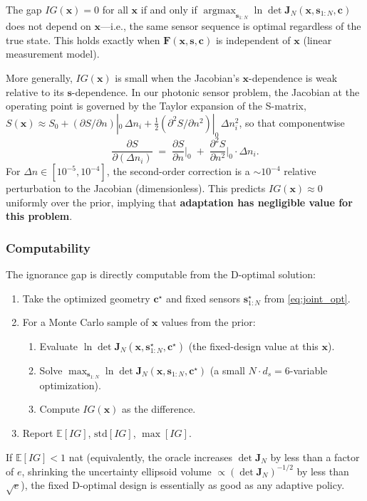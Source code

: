 \documentclass[11pt,a4paper]{article}
\newcommand{\E}{\mathbb{E}}
\newcommand{\argmax}{\operatorname{argmax}}
\begin{document}
The gap $IG(\bm{x}) = 0$ for all $\bm{x}$ if and only if $\argmax_{\bm{s}_{1:N}} \ln\det\bm{J}_N(\bm{x}, \bm{s}_{1:N}, \bm{c})$ does not depend on $\bm{x}$---i.e., the same sensor sequence is optimal regardless of the true state.  This holds exactly when $\bm{F}(\bm{x}, \bm{s}, \bm{c})$ is independent of $\bm{x}$ (linear measurement model).

More generally, $IG(\bm{x})$ is small when the Jacobian's $\bm{x}$-dependence is weak relative to its $\bm{s}$-dependence.  In our photonic sensor problem, the Jacobian at the operating point is governed by the Taylor expansion of the S-matrix, $S(\bm{x}) \approx S_0 + (\partial S/\partial n)|_0 \, \Delta n_i + \tfrac12(\partial^2 S/\partial n^2)|_0\,\Delta n_i^2$, so that componentwise
\begin{equation}
  \frac{\partial S}{\partial (\Delta n_i)} \;=\; \frac{\partial S}{\partial n}\bigg|_0 \;+\; \frac{\partial^2 S}{\partial n^2}\bigg|_0 \cdot \Delta n_i.
\end{equation}
For $\Delta n \in [10^{-5}, 10^{-4}]$, the second-order correction is a $\sim\!10^{-4}$ relative perturbation to the Jacobian (dimensionless).  This predicts $IG(\bm{x}) \approx 0$ uniformly over the prior, implying that \textbf{adaptation has negligible value for this problem}.

\subsubsection{Computability}

The ignorance gap is directly computable from the D-optimal solution:
\begin{enumerate}[nosep]
  \item Take the optimized geometry $\bm{c}^\star$ and fixed sensors $\bm{s}^\star_{1:N}$ from \eqref{eq:joint_opt}.
  \item For a Monte Carlo sample of $\bm{x}$ values from the prior:
  \begin{enumerate}[nosep]
    \item Evaluate $\ln\det\bm{J}_N(\bm{x}, \bm{s}^\star_{1:N}, \bm{c}^\star)$ (the fixed-design value at this $\bm{x}$).
    \item Solve $\max_{\bm{s}_{1:N}} \ln\det\bm{J}_N(\bm{x}, \bm{s}_{1:N}, \bm{c}^\star)$ (a small $N \cdot d_s = 6$-variable optimization).
    \item Compute $IG(\bm{x})$ as the difference.
  \end{enumerate}
  \item Report $\E[IG]$, $\text{std}[IG]$, $\max[IG]$.
\end{enumerate}
If $\E[IG] < 1$ nat (equivalently, the oracle increases $\det\bm{J}_N$ by less than a factor of $e$, shrinking the uncertainty ellipsoid volume $\propto(\det\bm{J}_N)^{-1/2}$ by less than $\sqrt{e}$), the fixed D-optimal design is essentially as good as any adaptive policy.
\end{document}
